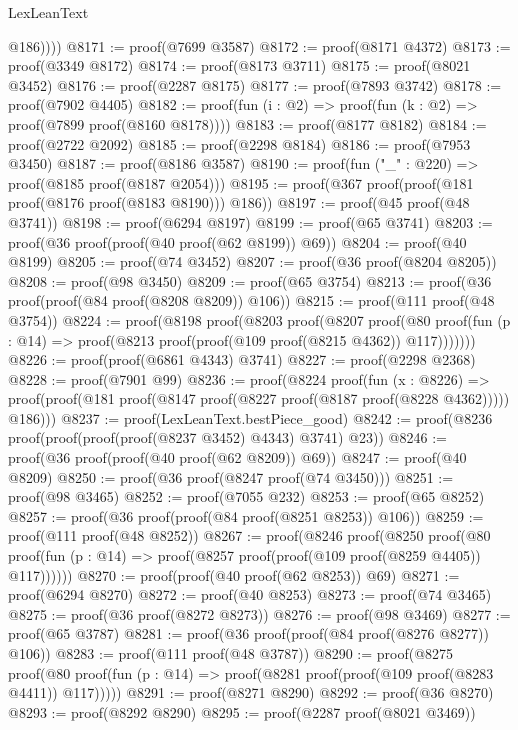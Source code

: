 \begin{lexlean}{LexLeanText}
\begin{coremodule}
              @186))))
@8171 := proof(@7699 @3587)
@8172 := proof(@8171 @4372)
@8173 := proof(@3349 @8172)
@8174 := proof(@8173 @3711)
@8175 := proof(@8021 @3452)
@8176 := proof(@2287 @8175)
@8177 := proof(@7893 @3742)
@8178 := proof(@7902 @4405)
@8182 := proof(fun (i : @2) => proof(fun (k : @2) => proof(@7899 proof(@8160 @8178))))
@8183 := proof(@8177 @8182)
@8184 := proof(@2722 @2092)
@8185 := proof(@2298 @8184)
@8186 := proof(@7953 @3450)
@8187 := proof(@8186 @3587)
@8190 := proof(fun ("_" : @220) => proof(@8185 proof(@8187 @2054)))
@8195 := proof(@367 proof(proof(@181 proof(@8176 proof(@8183 @8190))) @186))
@8197 := proof(@45 proof(@48 @3741))
@8198 := proof(@6294 @8197)
@8199 := proof(@65 @3741)
@8203 := proof(@36 proof(proof(@40 proof(@62 @8199)) @69))
@8204 := proof(@40 @8199)
@8205 := proof(@74 @3452)
@8207 := proof(@36 proof(@8204 @8205))
@8208 := proof(@98 @3450)
@8209 := proof(@65 @3754)
@8213 := proof(@36 proof(proof(@84 proof(@8208 @8209)) @106))
@8215 := proof(@111 proof(@48 @3754))
@8224 := proof(@8198
      proof(@8203
          proof(@8207
              proof(@80
                  proof(fun (p : @14) =>
                    proof(@8213 proof(proof(@109 proof(@8215 @4362)) @117)))))))
@8226 := proof(proof(@6861 @4343) @3741)
@8227 := proof(@2298 @2368)
@8228 := proof(@7901 @99)
@8236 := proof(@8224
      proof(fun (x : @8226) =>
        proof(proof(@181 proof(@8147 proof(@8227 proof(@8187 proof(@8228 @4362))))) @186)))
@8237 := proof(LexLeanText.bestPiece_good)
@8242 := proof(@8236 proof(proof(proof(proof(@8237 @3452) @4343) @3741) @23))
@8246 := proof(@36 proof(proof(@40 proof(@62 @8209)) @69))
@8247 := proof(@40 @8209)
@8250 := proof(@36 proof(@8247 proof(@74 @3450)))
@8251 := proof(@98 @3465)
@8252 := proof(@7055 @232)
@8253 := proof(@65 @8252)
@8257 := proof(@36 proof(proof(@84 proof(@8251 @8253)) @106))
@8259 := proof(@111 proof(@48 @8252))
@8267 := proof(@8246
      proof(@8250
          proof(@80
              proof(fun (p : @14) => proof(@8257 proof(proof(@109 proof(@8259 @4405)) @117))))))
@8270 := proof(proof(@40 proof(@62 @8253)) @69)
@8271 := proof(@6294 @8270)
@8272 := proof(@40 @8253)
@8273 := proof(@74 @3465)
@8275 := proof(@36 proof(@8272 @8273))
@8276 := proof(@98 @3469)
@8277 := proof(@65 @3787)
@8281 := proof(@36 proof(proof(@84 proof(@8276 @8277)) @106))
@8283 := proof(@111 proof(@48 @3787))
@8290 := proof(@8275
      proof(@80 proof(fun (p : @14) => proof(@8281 proof(proof(@109 proof(@8283 @4411)) @117)))))
@8291 := proof(@8271 @8290)
@8292 := proof(@36 @8270)
@8293 := proof(@8292 @8290)
@8295 := proof(@2287 proof(@8021 @3469))

\end{coremodule}
\end{lexlean}
